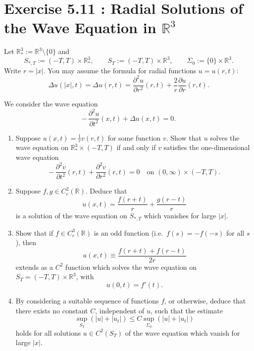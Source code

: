 \documentclass[12pt,a4paper]{article}
\theoremstyle{plain}
\theoremstyle{definition}
\theoremstyle{remark}
\theoremstyle{remark}
\begin{document}
\section*{Exercise 5.11 : Radial Solutions of the Wave Equation in $\mathbb{R}^3$}

Let $\mathbb{R}^3_* := \mathbb{R}^3\setminus\{0\}$ and
\[
S_{*,T} := (-T,T)\times\mathbb{R}^3_*, 
\qquad
S_T := (-T,T)\times\mathbb{R}^3,
\qquad
\Sigma_0 := \{0\}\times\mathbb{R}^3.
\]
Write $r = |x|$. You may assume the formula for radial functions
$u=u(r,t)$:
\[
\Delta u(|x|,t) = \Delta u(r,t)
= \frac{\partial^2 u}{\partial r^2}(r,t)
+ \frac{2}{r}\frac{\partial u}{\partial r}(r,t).
\]

We consider the wave equation
\[
-\,\frac{\partial^2 u}{\partial t^2}(x,t)
+ \Delta u(x,t) = 0.
\]

\begin{enumerate}[label=\textnormal{(\alph*)}]
	
	\item Suppose $u(x,t) = \frac{1}{r}v(r,t)$ for some function $v$.
	Show that $u$ solves the wave equation on $\mathbb{R}^3_*\times(-T,T)$
	if and only if $v$ satisfies the one-dimensional wave equation
	\[
	-\,\frac{\partial^2 v}{\partial t^2}(r,t)
	+ \frac{\partial^2 v}{\partial r^2}(r,t)
	= 0
	\quad\text{on } (0,\infty)\times(-T,T).
	\]
	
	\item Suppose $f,g\in C_c^2(\mathbb{R})$. Deduce that
	\[
	u(x,t) = \frac{f(r+t)}{r} + \frac{g(r-t)}{r}
	\]
	is a solution of the wave equation on $S_{*,T}$ which vanishes for
	large $|x|$.
	
	\item Show that if $f\in C_c^3(\mathbb{R})$ is an odd function
	(i.e.\ $f(s)=-f(-s)$ for all $s$), then
	\[
	u(x,t) \equiv \frac{f(r+t)+f(r-t)}{2r}
	\]
	extends as a $C^2$ function which solves the wave equation on
	$S_T=(-T,T)\times\mathbb{R}^3$, with
	\[
	u(0,t) = f'(t).
	\]
	
	\item[*d)] By considering a suitable sequence of functions $f$, or otherwise,
	deduce that there exists no constant $C$, independent of $u$, such that
	the estimate
	\[
	\sup_{S_T} (|u|+|u_t|)
	\le C \sup_{\Sigma_0} (|u|+|u_t|)
	\]
	holds for all solutions $u\in C^2(S_T)$ of the wave equation which vanish
	for large $|x|$.
	
\end{enumerate}

\end{document}
